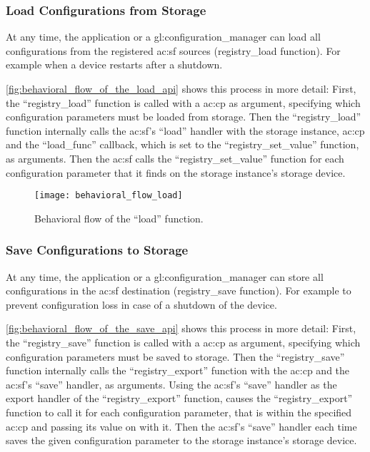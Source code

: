 \subsubsection{Load Configurations from Storage}
\label{sec:design:riot_registry:usage_flow:load_configurations_from_storage}

At any time, the application or a \gls{gl:configuration_manager} can load all configurations from the registered \gls{ac:sf} sources (registry\_load function).
For example when a device restarts after a shutdown.

\autoref{fig:behavioral_flow_of_the_load_api} shows this process in more detail:
First, the ``registry\_load'' function is called with a \gls{ac:cp} as argument, specifying which configuration parameters must be loaded from storage.
Then the ``registry\_load'' function internally calls the \gls{ac:sf}'s ``load'' handler with the storage instance, \gls{ac:cp} and the ``load\_func'' callback, which is set to the ``registry\_set\_value'' function, as arguments.
Then the \gls{ac:sf} calls the ``registry\_set\_value'' function for each configuration parameter that it finds on the storage instance's storage device.

\begin{figure}[H]
    \centering
    \texttt{[image: behavioral\_flow\_load]}
    \caption{Behavioral flow of the ``load'' function.}
    \label{fig:behavioral_flow_of_the_load_api}
\end{figure}

\subsubsection{Save Configurations to Storage}
\label{sec:design:riot_registry:usage_flow:save_configurations_to_storage}

At any time, the application or a \gls{gl:configuration_manager} can store all configurations in the \gls{ac:sf} destination (registry\_save function).
For example to prevent configuration loss in case of a shutdown of the device.

\autoref{fig:behavioral_flow_of_the_save_api} shows this process in more detail:
First, the ``registry\_save'' function is called with a \gls{ac:cp} as argument, specifying which configuration parameters must be saved to storage.
Then the ``registry\_save'' function internally calls the ``registry\_export'' function with the \gls{ac:cp} and the \gls{ac:sf}'s ``save'' handler, as arguments.
Using the \gls{ac:sf}'s ``save'' handler as the export handler of the ``registry\_export'' function, causes the ``registry\_export'' function to call it for each configuration parameter, that is within the specified \gls{ac:cp} and passing its value on with it.
Then the \gls{ac:sf}'s ``save'' handler each time saves the given configuration parameter to the storage instance's storage device.

